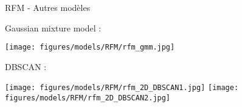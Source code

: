 \documentclass[10pt]{beamer}
\begin{document}
\begin{frame}{RFM - Autres modèles}
    \begin{overprint}
            Gaussian mixture model : 
            \begin{center}             
               \texttt{[image: figures/models/RFM/rfm\_gmm.jpg]}
            \end{center}
            DBSCAN :
            \begin{center}             
               \texttt{[image: figures/models/RFM/rfm\_2D\_DBSCAN1.jpg]}
               \texttt{[image: figures/models/RFM/rfm\_2D\_DBSCAN2.jpg]}
            \end{center}
    \end{overprint}
\end{frame}
\end{document}
